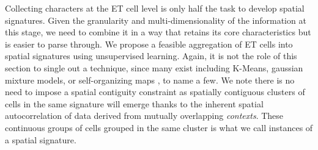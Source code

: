 Collecting characters at the ET cell level is only half the task to develop
spatial signatures. Given the granularity and multi-dimensionality of the
information at this stage, we need to combine it in a way that retains its
core characteristics but is easier to parse through.
%
We propose a feasible aggregation of ET cells into
spatial signatures using unsupervised learning. Again, it is not the role of
this section to single out a technique, since many exist including K-Means,
gaussian mixture models, or self-organizing maps \citep{kohonen1990self}, to
name a few. We note there is no need to impose a spatial contiguity constraint
as spatially contiguous clusters of cells in the same signature will emerge
thanks to the inherent spatial autocorrelation of data derived from mutually
overlapping \textit{contexts}.
%
These continuous groups of cells grouped in the same cluster is what we call
instances of a spatial signature.
